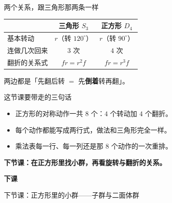 \documentclass[10pt]{beamer}
\begin{document}
\begin{frame}{两个关系，跟三角形那两条一样}
  \begin{center}
  \begin{tabular}{@{}lcc@{}}
    \toprule
     & 三角形 \(S_3\) & 正方形 \(D_4\) \\
    \midrule
    基本转动 & \(r\)（转 \(120^\circ\)） & \(r\)（转 \(90^\circ\)） \\
    连做几次回来 & \(3\) 次 & \(4\) 次 \\
    翻折的关系式 & \(fr=r^2f\) & \(fr=r^3f\) \\
    \bottomrule
  \end{tabular}
  \end{center}
  \pause
  \begin{center}
    {\large 两边都是「先翻后转 \(=\) 先\textbf{倒着}转再翻」。}
  \end{center}
\end{frame}

\begin{frame}{这节课要带走的三句话}
  \begin{itemize}
    \item 正方形的对称动作一共 \(8\) 个：\(4\) 个转动加 \(4\) 个翻折。
    \item 每个动作都能写成两行式，做法和三角形完全一样。
    \item 乘法表每一行、每一列还是那 \(8\) 个动作的一次重排。
  \end{itemize}
  \pause
  \begin{center}
    {\large\textcolor{textgreen}{\bfseries 下节课：在正方形里找小群，再看旋转与翻折的关系。}}
  \end{center}
\end{frame}

\begin{frame}
  \begin{center}
    \vspace{1.6cm}
    {\Large\textcolor{textgreen}{\bfseries 下课}}

    \vspace{1.0cm}
    {\large\textcolor{accentgreen}{下节课：正方形里的小群——子群与二面体群}}
  \end{center}
\end{frame}
\end{document}
